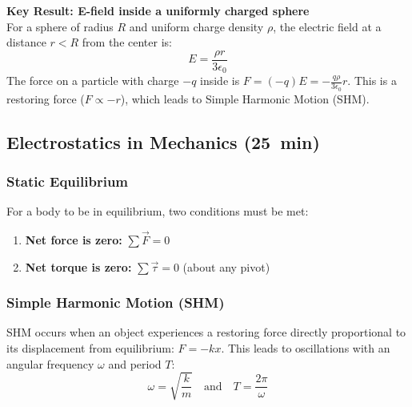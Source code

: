 \documentclass{article}
\numberwithin{equation}{section}
\begin{document}
\begin{center}
\end{center}

\textbf{Key Result: E-field inside a uniformly charged sphere}\\
For a sphere of radius $R$ and uniform charge density $\rho$, the electric field at a distance $r < R$ from the center is:
$$ E = \frac{\rho r}{3\epsilon_0} $$
The force on a particle with charge $-q$ inside is $F = (-q)E = -\frac{q\rho}{3\epsilon_0}r$. This is a restoring force ($F \propto -r$), which leads to Simple Harmonic Motion (SHM).

\subsection{Electrostatics in Mechanics (\SI{25}{min})}
\subsubsection{Static Equilibrium}
For a body to be in equilibrium, two conditions must be met:
\begin{enumerate}
    \item \textbf{Net force is zero:} $\sum \vec{F} = 0$
    \item \textbf{Net torque is zero:} $\sum \vec{\tau} = 0$ (about any pivot)
\end{enumerate}

\subsubsection{Simple Harmonic Motion (SHM)}
SHM occurs when an object experiences a restoring force directly proportional to its displacement from equilibrium: $F = -kx$. This leads to oscillations with an angular frequency $\omega$ and period $T$:
$$ \omega = \sqrt{\frac{k}{m}} \quad \text{and} \quad T = \frac{2\pi}{\omega} $$
\end{document}
